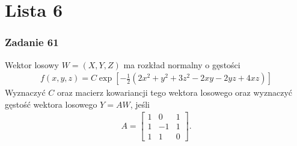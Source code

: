 \chapter*{Lista 6}


\subsection*{Zadanie 61}
Wektor losowy $ W=(X,Y,Z) $ ma rozkład normalny o gęstości
\begin{gather*}
f(x,y,z)=C\exp\left[-\frac{1}{2}\left(2x^2+y^2+3z^2-2xy-2yz+4xz\right)\right]
\end{gather*}
Wyznaczyć $ C $ oraz macierz kowariancji tego wektora losowego oraz wyznaczyć gęstość wektora losowego $ Y=AW $, jeśli
\begin{gather*}
A=\begin{bmatrix}
	1 & 0  & 1 \\
	1 & -1 & 1 \\
	1 & 1  & 0
\end{bmatrix}.
\end{gather*}


